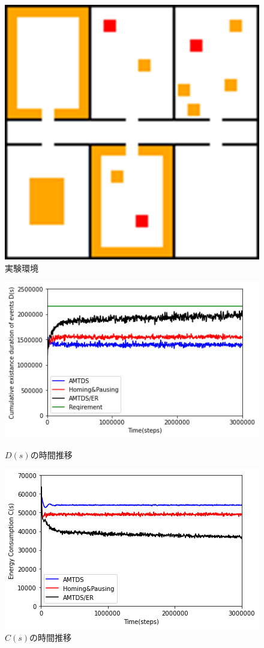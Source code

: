 \documentclass[11pt,a4j,twocolumn]{jarticle}
\begin{document}
\begin{figure}
  \centering
  \includegraphics[width=0.5\hsize]{figures/Graph_Office.png}
  \caption{実験環境}
  \label{fig:env}
\end{figure}

\begin{figure}
  \centering
  \includegraphics[width=0.8\hsize]{figures/ds_graph_3600_ave_ER_Office_600.png}
  \caption{$D(s)$の時間推移}
  \label{fig:ds_ER_Office}
  \centering
  \includegraphics[width=0.8\hsize]{figures/cs_graph_3600_ave_ER_Office_600.png}
  \caption{$C(s)$の時間推移}
  \label{fig:cs_ER_Office}
\end{figure}
\end{document}
